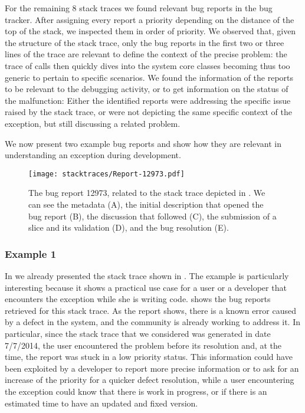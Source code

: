 For the remaining 8 stack traces we found relevant bug reports in the bug tracker.
After assigning every report a priority depending on the distance of the top of the stack, we inspected them in order of priority.
We observed that, given the structure of the stack trace, only the bug reports in the first two or three lines of the trace are relevant to define the context of the precise problem: the trace of calls then quickly dives into the system core classes becoming thus too generic to pertain to specific scenarios.
We found the information of the reports to be relevant to the debugging activity, or to get information on the status of the malfunction: Either the identified reports were addressing the specific issue raised by the stack trace, or were not depicting the same specific context of the exception, but still discussing a related problem.

We now present two example bug reports and show how they are relevant in understanding an exception during development.


\clearpage
\begin{figure}[!ht]
\begin{center}
  \texttt{[image: stacktraces/Report-12973.pdf]}
  \caption{The bug report 12973, related to the stack trace depicted in .
We can see the metadata (A), the initial description that opened the bug report (B), the discussion that followed (C), the submission of a slice and its validation (D), and the bug resolution (E).}
  \label{fig:report}
\end{center}
\end{figure}

\subsubsection{Example 1}

In  we already presented the stack trace shown in .
The example is particularly interesting because it shows a practical use case for a user or a developer that encounters the exception while she is writing code.
 shows the bug reports retrieved for this stack trace.
As the report shows, there is a known error caused by a defect in the system, and the community is already working to address it.
In particular, since the stack trace that we considered was generated in date 7/7/2014, the user encountered the problem before its resolution and, at the time, the report was stuck in a low priority status.
This information could have been exploited by a developer to report more precise information or to ask for an increase of the priority for a quicker defect resolution, while a user encountering the exception could know that there is work in progress, or if there is an estimated time to have an updated and fixed version.

